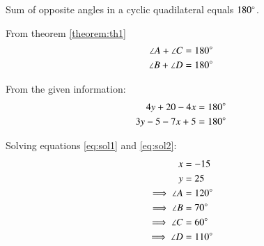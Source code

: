 \begin{theorem}\label{theorem:th1}
Sum of opposite angles in a cyclic quadilateral equals $180\degree$.
\end{theorem}
\solution  From theorem \ref{theorem:th1}
\begin{align}
\angle A + \angle C &=  180\degree\\
\angle B + \angle D &=  180\degree
\end{align}

From the given information:
\begin{align}
4y+20-4x &= 180\degree \label{eq:sol1} \\
3y-5-7x+5 &= 180\degree \label{eq:sol2}
\end{align}

Solving equations \ref{eq:sol1} and \ref{eq:sol2}:
\begin{align}
x &= -15 \\
y &= 25 \\
\implies \angle A &= 120\degree \\
\implies \angle B &= 70\degree \\
\implies \angle C &= 60\degree \\
\implies \angle D &= 110\degree 
\end{align}




